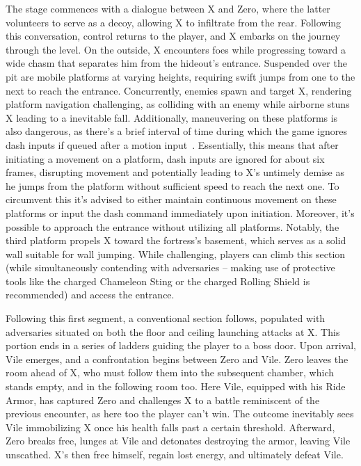 The stage commences with a dialogue between X and Zero, where the latter volunteers to serve as a decoy, allowing X to infiltrate from the rear. Following this conversation, control returns to the player, and X embarks on the journey through the level. On the outside, X encounters foes while progressing toward a wide chasm that separates him from the hideout's entrance. Suspended over the pit are mobile platforms at varying heights, requiring swift jumps from one to the next to reach the entrance. Concurrently, enemies spawn and target X, rendering platform navigation challenging, as colliding with an enemy while airborne stuns X leading to a inevitable fall. Additionally, maneuvering on these platforms is also dangerous, as there's a brief interval of time during which the game ignores dash inputs if queued after a motion input~\cite{RTA_wiki:X1}. Essentially, this means that after initiating a  movement on a platform, dash inputs are ignored for about six frames, disrupting movement and potentially leading to X's untimely demise as he jumps from the platform without sufficient speed to reach the next one. To circumvent this it's advised to either maintain continuous movement on these platforms or input the dash command immediately upon initiation. Moreover, it's possible to approach the entrance without utilizing all platforms. Notably, the third platform propels X toward the fortress's basement, which serves as a solid wall suitable for wall jumping. While challenging, players can climb this section (while simultaneously contending with adversaries – making use of protective tools like the charged Chameleon Sting or the charged Rolling Shield is recommended) and access the entrance.

Following this first segment, a conventional section follows, populated with adversaries situated on both the floor and ceiling launching attacks at X. This portion ends in a series of ladders guiding the player to a boss door. Upon arrival, Vile emerges, and a confrontation begins between Zero and Vile. Zero leaves the room ahead of X, who must follow them into the subsequent chamber, which stands empty, and in the following room too. Here Vile, equipped with his Ride Armor, has captured Zero and challenges X to a battle reminiscent of the previous encounter, as here too the player can't win. The outcome inevitably sees Vile immobilizing X once his health falls past a certain threshold. Afterward, Zero breaks free, lunges at Vile and detonates destroying the armor, leaving Vile unscathed. X's then free himself, regain lost energy, and ultimately defeat Vile.

